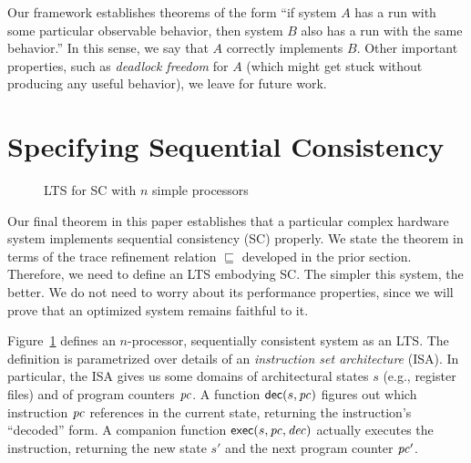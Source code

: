 Our framework establishes theorems of the form ``if system $A$ has a run with some particular observable behavior, then system $B$ also has a run with the same behavior.''  In this sense, we say that $A$ correctly implements $B$. Other important properties, such as \emph{deadlock freedom} for $A$ (which might get stuck without producing any useful behavior), we leave for future work.

\section{Specifying Sequential Consistency}\label{sec:sc}

\begin{figure}
\small
\centering
\begin{boxedminipage}[c]{.48\textwidth}
{}
{}

{}

{}

{}
\end{boxedminipage}
\caption{LTS for SC with $n$ simple processors}
\label{Ref}
\end{figure}

Our final theorem in this paper establishes that a particular complex hardware
system implements sequential consistency (SC) properly.  We state the theorem
in terms of the trace refinement relation $\sqsubseteq$ developed in the prior
section.  Therefore, we need to define an LTS embodying SC.  The simpler this
system, the better.  We do not need to worry about its performance properties,
since we will prove that an optimized system remains faithful to it.

Figure~\ref{Ref} defines an $n$-processor, sequentially consistent system as an
LTS.  The definition is parametrized over details of an \emph{instruction set
architecture} (ISA).  In particular, the ISA gives us some domains of
architectural states $s$ (e.g., register files) and of program counters $\mathit{pc}$.
A function $\mathsf{dec}(s, \mathit{pc})$ figures out which instruction $\mathit{pc}$ references in the
current state, returning the instruction's ``decoded'' form.  A companion
function $\mathsf{exec}(s, \mathit{pc}, \mathit{dec})$ actually executes the instruction,
returning the new state $s'$ and the next program counter $\mathit{pc}'$.

